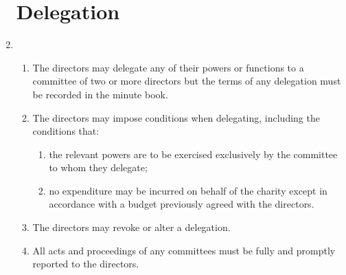 \documentclass{article}
\begin{document}
\begin{enumerate}[label=\arabic*, start=23]
    \section{Delegation}
    \item \begin{enumerate}[label=(\arabic*)]
        \item The directors may delegate any of their powers or functions
        to a committee of two or more directors but the terms of any
        delegation must be recorded in the minute book.
        \item The directors may impose conditions when delegating, including
        the conditions that:
        \begin{enumerate}[label=(\alph*)]
            \item the relevant powers are to be exercised exclusively by the
            committee to whom they delegate;
            \item no expenditure may be incurred on behalf of the charity
            except in accordance with a budget previously agreed
            with the directors.
        \end{enumerate}
        \item The directors may revoke or alter a delegation.
        \item All acts and proceedings of any committees must be fully and
        promptly reported to the directors.
    \end{enumerate}
    

\end{enumerate}
\end{document}
